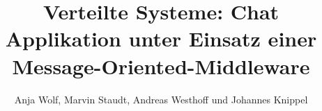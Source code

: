 \documentclass[10pt,journal,compsoc]{IEEEtran}
\begin{document}
%
\title{Verteilte Systeme: Chat Applikation unter Einsatz einer Message-Oriented-Middleware}
%
%
%
%

\author{Anja Wolf, 
		Marvin Staudt,
        Andreas Westhoff
        und Johannes Knippel}

% 
%
\end{document}
